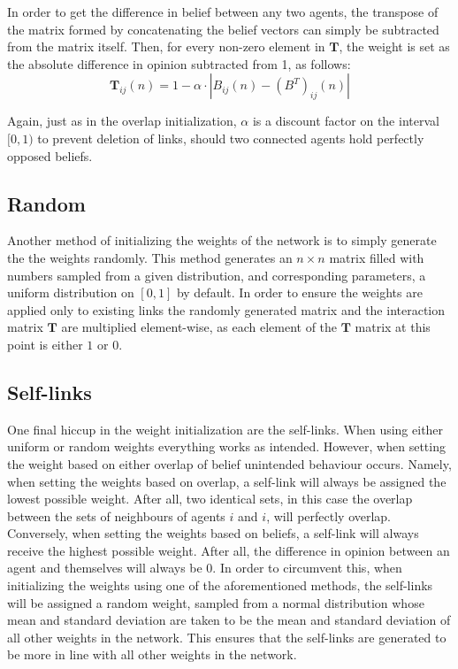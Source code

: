 \documentclass{article}
\newcommand{\T}{\textbf{T}}
\begin{document}
In order to get the difference in belief between any two agents, the transpose of the matrix formed by concatenating the belief vectors can simply be subtracted from the matrix itself. Then, for every non-zero element in $\T$, the weight is set as the absolute difference in opinion subtracted from 1, as follows:
\begin{equation}
    \T_{ij}(n) = 1 - \alpha \cdot |B_{ij}(n) - (B^{T})_{ij}(n)|
\end{equation}

Again, just as in the overlap initialization, $\alpha$ is a discount factor on the interval $[0, 1)$ to prevent deletion of links, should two connected agents hold perfectly opposed beliefs.

\subsection{Random}

Another method of initializing the weights of the network is to simply generate the the weights randomly. This method generates an $n \times n$ matrix filled with numbers sampled from a given distribution, and corresponding parameters, a uniform distribution on $[0, 1]$ by default. In order to ensure the weights are applied only to existing links the randomly generated matrix and the interaction matrix $\T$ are multiplied element-wise, as each element of the $\T$ matrix at this point is either $1$ or $0$.

\subsection{Self-links}

One final hiccup in the weight initialization are the self-links. When using either uniform or random weights everything works as intended. However, when setting the weight based on either overlap of belief unintended behaviour occurs. Namely, when setting the weights based on overlap, a self-link will always be assigned the lowest possible weight. After all, two identical sets, in this case the overlap between the sets of neighbours of agents $i$ and $i$, will perfectly overlap.
Conversely, when setting the weights based on beliefs, a self-link will always receive the highest possible weight. After all, the difference in opinion between an agent and themselves will always be $0$. \newline
In order to circumvent this, when initializing the weights using one of the aforementioned methods, the self-links will be assigned a random weight, sampled from a normal distribution whose mean and standard deviation are taken to be the mean and standard deviation of all other weights in the network. This ensures that the self-links are generated to be more in line with all other weights in the network.
\end{document}
